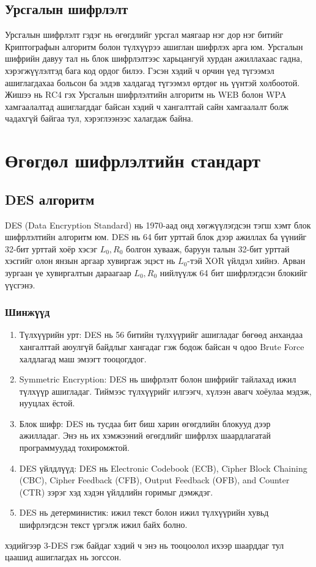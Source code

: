 	\subsection{Урсгалын шифрлэлт}
	Урсгалын шифрлэлт гэдэг нь өгөгдлийг урсгал маягаар нэг дор нэг битийг Криптографын алгоритм болон түлхүүрээ ашиглан шифрлэх арга юм. Урсгалын шифрийн давуу тал нь блок шифрлэлтээс харьцангуй хурдан ажиллахаас гадна, хэрэгжүүлэлтэд бага код ордог билээ. Гэсэн хэдий ч орчин үед түгээмэл ашиглагдахаа больсон ба элдэв халдагад түгээмэл өртдөг нь үүнтэй холбоотой. Жишээ нь RC4 гэх Урсгалын шифрлэлтийн алгоритм нь WEB болон WPA хамгаалалтад ашиглагддаг байсан хэдий ч хангалттай сайн хамгаалалт болж чадахгүй байгаа тул, хэрэглээнээс халагдаж байна.

	\section{Өгөгдөл шифрлэлтийн стандарт}
	\subsection{DES алгоритм}
	DES (Data Encryption Standard) нь 1970-аад онд хөгжүүлэгдсэн тэгш хэмт блок шифрлэлтийн алгоритм юм. DES нь 64 бит урттай блок дээр ажиллах ба үүнийг 32-бит урттай хоёр хэсэг $L_{0}, R_{0}$ болгон хувааж, баруун талын 32-бит урттай хэсгийг олон янзын аргаар хувиргаж эцэст нь $L_{0}$-тэй XOR үйлдэл хийнэ. Арван зургаан үе хувиргалтын дараагаар $L_{0}, R_{0}$ нийлүүлж 64 бит шифрлэгдсэн блокийг үүсгэнэ.
	\subsubsection{Шинжүүд}
	\begin{enumerate}
		\item Түлхүүрийн урт: DES нь 56 битийн түлхүүрийг ашигладаг бөгөөд анхандаа хангалттай аюулгүй байдлыг хангадаг гэж бодож байсан ч одоо Brute Force халдлагад маш эмзэгт тооцогддог.
		\item Symmetric Encryption: DES нь шифрлэлт болон шифрийг тайлахад ижил түлхүүр ашигладаг. Тиймээс түлхүүрийг илгээгч, хүлээн авагч хоёулаа мэдэж, нууцлах ёстой.

		\item Блок шифр: DES нь тусдаа бит биш харин өгөгдлийн блокууд дээр ажилладаг. Энэ нь их хэмжээний өгөгдлийг шифрлэх шаардлагатай программуудад тохиромжтой.

		\item DES үйлдлүүд: DES нь  Electronic Codebook (ECB), Cipher Block Chaining (CBC), Cipher Feedback (CFB), Output Feedback (OFB), and Counter (CTR) зэрэг хэд хэдэн үйлдлийн горимыг дэмждэг.

		\item DES нь детерминистик: ижил текст болон ижил түлхүүрийн хувьд шифрлэгдсэн текст үргэлж ижил байх болно.
	\end{enumerate}
	хэдийгээр 3-DES гэж байдаг хэдий ч энэ нь тооцоолол ихээр шаарддаг тул цаашид ашиглагдах нь зогссон.

